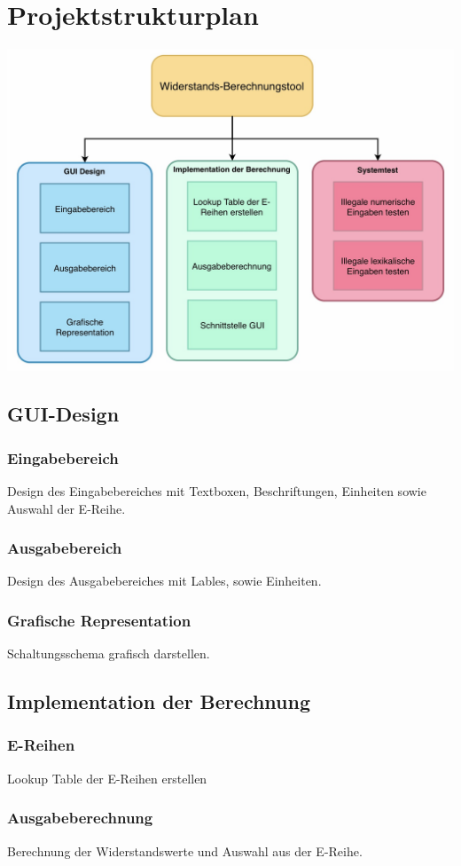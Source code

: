 \section{Projektstrukturplan}
\includegraphics[width=14cm]{images/Projektstrukturplan}

\subsection{GUI-Design}
\subsubsection{Eingabebereich}
Design des Eingabebereiches mit Textboxen, Beschriftungen, Einheiten sowie Auswahl der E-Reihe.
\subsubsection{Ausgabebereich}
Design des Ausgabebereiches mit Lables, sowie Einheiten.
\subsubsection{Grafische Representation}
Schaltungsschema grafisch darstellen.
\subsection{Implementation der Berechnung}
\subsubsection{E-Reihen}
Lookup Table der E-Reihen erstellen
\subsubsection{Ausgabeberechnung}
Berechnung der Widerstandswerte und Auswahl aus der E-Reihe.
